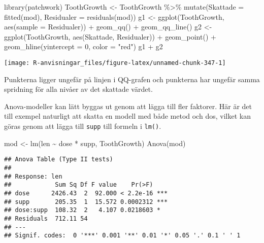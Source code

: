 \documentclass[
]{book}
\newenvironment{Shaded}{\begin{snugshade}}{\end{snugshade}}
\newcommand{\AttributeTok}[1]{\textcolor[rgb]{0.77,0.63,0.00}{#1}}
\newcommand{\DecValTok}[1]{\textcolor[rgb]{0.00,0.00,0.81}{#1}}
\newcommand{\FunctionTok}[1]{\textcolor[rgb]{0.00,0.00,0.00}{#1}}
\newcommand{\NormalTok}[1]{#1}
\newcommand{\OtherTok}[1]{\textcolor[rgb]{0.56,0.35,0.01}{#1}}
\newcommand{\SpecialCharTok}[1]{\textcolor[rgb]{0.00,0.00,0.00}{#1}}
\newcommand{\StringTok}[1]{\textcolor[rgb]{0.31,0.60,0.02}{#1}}
\theoremstyle{definition}
\theoremstyle{definition}
\theoremstyle{definition}
\theoremstyle{definition}
\theoremstyle{remark}
\begin{document}
\begin{Shaded}
\begin{Highlighting}[]
\FunctionTok{library}\NormalTok{(patchwork)}
\NormalTok{ToothGrowth }\OtherTok{\textless{}{-}}\NormalTok{ ToothGrowth }\SpecialCharTok{\%\textgreater{}\%} 
  \FunctionTok{mutate}\NormalTok{(}\AttributeTok{Skattade =} \FunctionTok{fitted}\NormalTok{(mod),}
         \AttributeTok{Residualer =} \FunctionTok{residuals}\NormalTok{(mod))}
\NormalTok{g1 }\OtherTok{\textless{}{-}} \FunctionTok{ggplot}\NormalTok{(ToothGrowth, }\FunctionTok{aes}\NormalTok{(}\AttributeTok{sample =}\NormalTok{ Residualer)) }\SpecialCharTok{+} \FunctionTok{geom\_qq}\NormalTok{() }\SpecialCharTok{+} \FunctionTok{geom\_qq\_line}\NormalTok{()}
\NormalTok{g2 }\OtherTok{\textless{}{-}} \FunctionTok{ggplot}\NormalTok{(ToothGrowth, }\FunctionTok{aes}\NormalTok{(Skattade, Residualer)) }\SpecialCharTok{+}
  \FunctionTok{geom\_point}\NormalTok{() }\SpecialCharTok{+}
  \FunctionTok{geom\_hline}\NormalTok{(}\AttributeTok{yintercept =} \DecValTok{0}\NormalTok{, }\AttributeTok{color =} \StringTok{"red"}\NormalTok{)}
\NormalTok{g1 }\SpecialCharTok{+}\NormalTok{ g2}
\end{Highlighting}
\end{Shaded}

\begin{center}\texttt{[image: R-anvisningar\_files/figure-latex/unnamed-chunk-347-1]} \end{center}

Punkterna ligger ungefär på linjen i QQ-grafen och punkterna har ungefär samma spridning för alla nivåer av det skattade värdet.

Anova-modeller kan lätt byggas ut genom att lägga till fler faktorer. Här är det till exempel naturligt att skatta en modell med både metod och dos, vilket kan göras genom att lägga till \texttt{supp} till formeln i \texttt{lm()}.

\begin{Shaded}
\begin{Highlighting}[]
\NormalTok{mod }\OtherTok{\textless{}{-}} \FunctionTok{lm}\NormalTok{(len }\SpecialCharTok{\textasciitilde{}}\NormalTok{ dose }\SpecialCharTok{*}\NormalTok{ supp, ToothGrowth)}
\FunctionTok{Anova}\NormalTok{(mod)}
\end{Highlighting}
\end{Shaded}

\begin{verbatim}
## Anova Table (Type II tests)
## 
## Response: len
##            Sum Sq Df F value    Pr(>F)    
## dose      2426.43  2  92.000 < 2.2e-16 ***
## supp       205.35  1  15.572 0.0002312 ***
## dose:supp  108.32  2   4.107 0.0218603 *  
## Residuals  712.11 54                      
## ---
## Signif. codes:  0 '***' 0.001 '**' 0.01 '*' 0.05 '.' 0.1 ' ' 1
\end{verbatim}
\end{document}
